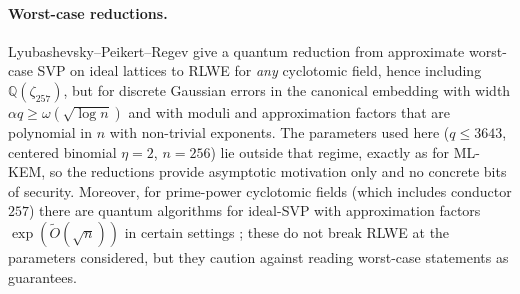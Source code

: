 \documentclass[11pt]{article}
\theoremstyle{remark}
\begin{document}
\paragraph{Worst-case reductions.} Lyubashevsky--Peikert--Regev \cite{LPR13} give a quantum reduction from approximate worst-case SVP on ideal lattices to RLWE for \emph{any} cyclotomic field, hence including $\mathbb{Q}(\zeta_{257})$, but for discrete Gaussian errors in the canonical embedding with width $\alpha q\ge\omega(\sqrt{\log n})$ and with moduli and approximation factors that are polynomial in $n$ with non-trivial exponents. The parameters used here ($q\le3643$, centered binomial $\eta=2$, $n=256$) lie outside that regime, exactly as for ML-KEM, so the reductions provide asymptotic motivation only and no concrete bits of security. Moreover, for prime-power cyclotomic fields (which includes conductor $257$) there are quantum algorithms for ideal-SVP with approximation factors $\exp(\tilde O(\sqrt n))$ in certain settings \cite{CDPR16,CDW17}; these do not break RLWE at the parameters considered, but they caution against reading worst-case statements as guarantees.
\end{document}
